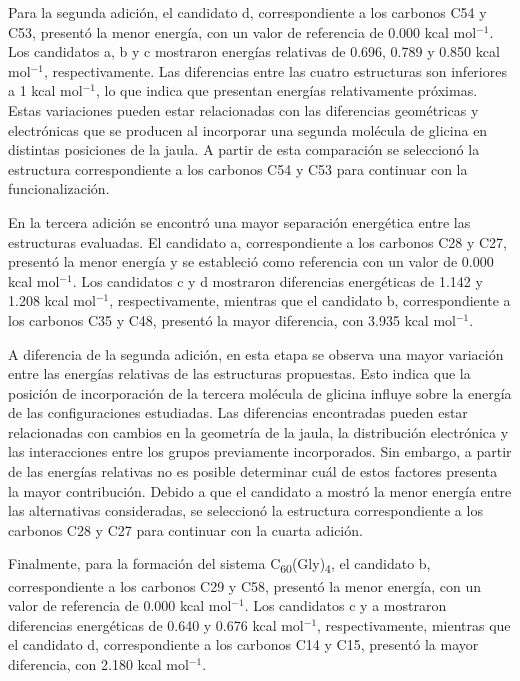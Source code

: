  Para la segunda adición, el candidato d, correspondiente a los carbonos C54 y C53, presentó la menor energía, con un valor de referencia de 0.000 kcal mol$^{-1}$. Los candidatos a, b y c mostraron energías relativas de 0.696, 0.789 y 0.850 kcal mol$^{-1}$, respectivamente. Las diferencias entre las cuatro estructuras son inferiores a 1 kcal mol$^{-1}$, lo que indica que presentan energías relativamente próximas. Estas variaciones pueden estar relacionadas con las diferencias geométricas y electrónicas que se producen al incorporar una segunda molécula de glicina en distintas posiciones de la jaula. A partir de esta comparación se seleccionó la estructura correspondiente a los carbonos C54 y C53 para continuar con la funcionalización.

En la tercera adición se encontró una mayor separación energética entre las estructuras evaluadas. El candidato a, correspondiente a los carbonos C28 y C27, presentó la menor energía y se estableció como referencia con un valor de 0.000 kcal mol$^{-1}$. Los candidatos c y d mostraron diferencias energéticas de 1.142 y 1.208 kcal mol$^{-1}$, respectivamente, mientras que el candidato b, correspondiente a los carbonos C35 y C48, presentó la mayor diferencia, con 3.935 kcal mol$^{-1}$.

A diferencia de la segunda adición, en esta etapa se observa una mayor variación entre las energías relativas de las estructuras propuestas. Esto indica que la posición de incorporación de la tercera molécula de glicina influye sobre la energía de las configuraciones estudiadas. Las diferencias encontradas pueden estar relacionadas con cambios en la geometría de la jaula, la distribución electrónica y las interacciones entre los grupos previamente incorporados. Sin embargo, a partir de las energías relativas no es posible determinar cuál de estos factores presenta la mayor contribución. Debido a que el candidato a mostró la menor energía entre las alternativas consideradas, se seleccionó la estructura correspondiente a los carbonos C28 y C27 para continuar con la cuarta adición.

Finalmente, para la formación del sistema C\textsubscript{60}(Gly)\textsubscript{4}, el candidato b, correspondiente a los carbonos C29 y C58, presentó la menor energía, con un valor de referencia de 0.000 kcal mol$^{-1}$. Los candidatos c y a mostraron diferencias energéticas de 0.640 y 0.676 kcal mol$^{-1}$, respectivamente, mientras que el candidato d, correspondiente a los carbonos C14 y C15, presentó la mayor diferencia, con 2.180 kcal mol$^{-1}$.


